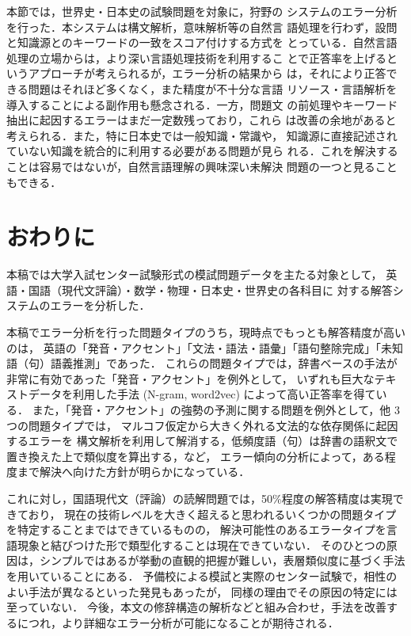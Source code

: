 \documentclass[japanese]{jnlp_1.4b}
\begin{document}
本節では，世界史・日本史の試験問題を対象に，狩野\cite{kano2014jsai}の
システムのエラー分析を行った．本システムは構文解析，意味解析等の自然言
語処理を行わず，設問と知識源とのキーワードの一致をスコア付けする方式を
とっている．自然言語処理の立場からは，より深い言語処理技術を利用するこ
とで正答率を上げるというアプローチが考えられるが，エラー分析の結果から
は，それにより正答できる問題はそれほど多くなく，また精度が不十分な言語
リソース・言語解析を導入することによる副作用も懸念される．一方，問題文
の前処理やキーワード抽出に起因するエラーはまだ一定数残っており，これら
は改善の余地があると考えられる．また，特に日本史では一般知識・常識や，
知識源に直接記述されていない知識を統合的に利用する必要がある問題が見ら
れる．これを解決することは容易ではないが，自然言語理解の興味深い未解決
問題の一つと見ることもできる．


\section{おわりに}

本稿では大学入試センター試験形式の模試問題データを主たる対象として，
英語・国語（現代文評論）・数学・物理・日本史・世界史の各科目に
対する解答システムのエラーを分析した．

本稿でエラー分析を行った問題タイプのうち，現時点でもっとも解答精度が高いのは，
英語の「発音・アクセント」「文法・語法・語彙」「語句整除完成」「未知語（句）語義推測」であった．
これらの問題タイプでは，辞書ベースの手法が非常に有効であった「発音・アクセント」を例外として，
いずれも巨大なテキストデータを利用した手法 (N-gram, word2vec) によって高い正答率を得ている．
また，「発音・アクセント」の強勢の予測に関する問題を例外として，他 3 つの問題タイプでは，
マルコフ仮定から大きく外れる文法的な依存関係に起因するエラーを
構文解析を利用して解消する，低頻度語（句）は辞書の語釈文で置き換えた上で類似度を算出する，など，
エラー傾向の分析によって，ある程度まで解決へ向けた方針が明らかになっている．

これに対し，国語現代文（評論）の読解問題では，50\%程度の解答精度は実現できており，
現在の技術レベルを大きく超えると思われるいくつかの問題タイプを特定することまではできているものの，
解決可能性のあるエラータイプを言語現象と結びつけた形で類型化することは現在できていない．
そのひとつの原因は，シンプルではあるが挙動の直観的把握が難しい，表層類似度に基づく手法を用いていることにある．
予備校による模試と実際のセンター試験で，相性のよい手法が異なるといった発見もあったが，
同様の理由でその原因の特定には至っていない．
今後，本文の修辞構造の解析などと組み合わせ，手法を改善するにつれ，より詳細なエラー分析が可能になることが期待される．
\end{document}
